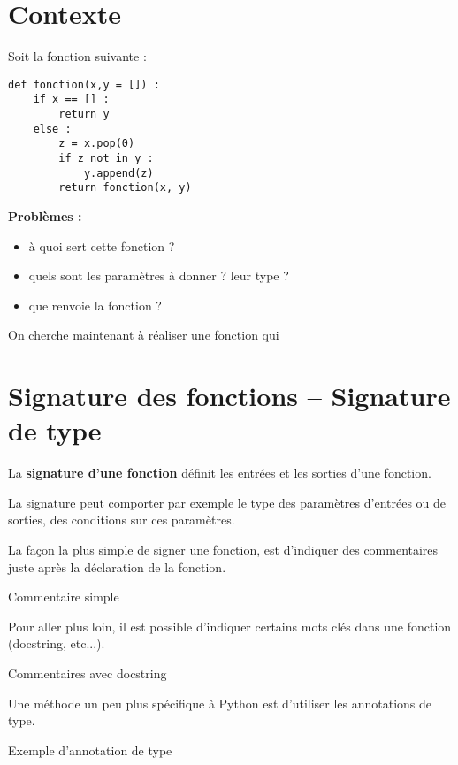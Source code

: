 \section{Contexte}
Soit la fonction suivante : 
\begin{lstlisting}
def fonction(x,y = []) :
    if x == [] : 
        return y
    else : 
        z = x.pop(0)
        if z not in y : 
            y.append(z)
        return fonction(x, y)
\end{lstlisting}

\textbf{Problèmes :}
\begin{itemize}
\item à quoi sert cette fonction ?
\item quels sont les paramètres à donner ? leur type ?
\item que renvoie la fonction ?
\end{itemize}

On cherche maintenant à réaliser une fonction qui 

\section{Signature des fonctions -- Signature de type}
\begin{defi}
La \textbf{signature d'une fonction} définit les entrées et les sorties d'une fonction. 
\end{defi}


La signature peut comporter par exemple le type  des paramètres d'entrées ou de sorties, des conditions sur ces paramètres. 

La façon la plus simple de signer une fonction, est d'indiquer des commentaires juste après la déclaration de la fonction. 

\begin{exemple}
Commentaire simple
\end{exemple}


Pour aller plus loin, il est possible d'indiquer certains mots clés dans une fonction (docstring, etc...).

\begin{exemple}
Commentaires avec docstring
\end{exemple}

Une méthode un peu plus spécifique à Python est d'utiliser les annotations de type. 

\begin{exemple}
Exemple d'annotation de type
\end{exemple}


